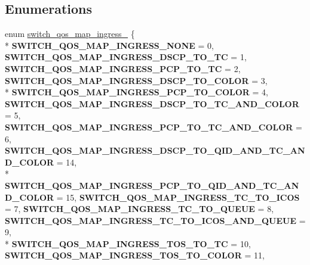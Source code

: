 \subsection*{Enumerations}
\begin{DoxyCompactItemize}
\item 
enum \hyperlink{group__QOS_ga31ec012ceb021095a2de97a1a3438612}{switch\+\_\+qos\+\_\+map\+\_\+ingress\+\_\+} \{ \\*
{\bfseries S\+W\+I\+T\+C\+H\+\_\+\+Q\+O\+S\+\_\+\+M\+A\+P\+\_\+\+I\+N\+G\+R\+E\+S\+S\+\_\+\+N\+O\+N\+E} = 0, 
{\bfseries S\+W\+I\+T\+C\+H\+\_\+\+Q\+O\+S\+\_\+\+M\+A\+P\+\_\+\+I\+N\+G\+R\+E\+S\+S\+\_\+\+D\+S\+C\+P\+\_\+\+T\+O\+\_\+\+T\+C} = 1, 
{\bfseries S\+W\+I\+T\+C\+H\+\_\+\+Q\+O\+S\+\_\+\+M\+A\+P\+\_\+\+I\+N\+G\+R\+E\+S\+S\+\_\+\+P\+C\+P\+\_\+\+T\+O\+\_\+\+T\+C} = 2, 
{\bfseries S\+W\+I\+T\+C\+H\+\_\+\+Q\+O\+S\+\_\+\+M\+A\+P\+\_\+\+I\+N\+G\+R\+E\+S\+S\+\_\+\+D\+S\+C\+P\+\_\+\+T\+O\+\_\+\+C\+O\+L\+O\+R} = 3, 
\\*
{\bfseries S\+W\+I\+T\+C\+H\+\_\+\+Q\+O\+S\+\_\+\+M\+A\+P\+\_\+\+I\+N\+G\+R\+E\+S\+S\+\_\+\+P\+C\+P\+\_\+\+T\+O\+\_\+\+C\+O\+L\+O\+R} = 4, 
{\bfseries S\+W\+I\+T\+C\+H\+\_\+\+Q\+O\+S\+\_\+\+M\+A\+P\+\_\+\+I\+N\+G\+R\+E\+S\+S\+\_\+\+D\+S\+C\+P\+\_\+\+T\+O\+\_\+\+T\+C\+\_\+\+A\+N\+D\+\_\+\+C\+O\+L\+O\+R} = 5, 
{\bfseries S\+W\+I\+T\+C\+H\+\_\+\+Q\+O\+S\+\_\+\+M\+A\+P\+\_\+\+I\+N\+G\+R\+E\+S\+S\+\_\+\+P\+C\+P\+\_\+\+T\+O\+\_\+\+T\+C\+\_\+\+A\+N\+D\+\_\+\+C\+O\+L\+O\+R} = 6, 
{\bfseries S\+W\+I\+T\+C\+H\+\_\+\+Q\+O\+S\+\_\+\+M\+A\+P\+\_\+\+I\+N\+G\+R\+E\+S\+S\+\_\+\+D\+S\+C\+P\+\_\+\+T\+O\+\_\+\+Q\+I\+D\+\_\+\+A\+N\+D\+\_\+\+T\+C\+\_\+\+A\+N\+D\+\_\+\+C\+O\+L\+O\+R} = 14, 
\\*
{\bfseries S\+W\+I\+T\+C\+H\+\_\+\+Q\+O\+S\+\_\+\+M\+A\+P\+\_\+\+I\+N\+G\+R\+E\+S\+S\+\_\+\+P\+C\+P\+\_\+\+T\+O\+\_\+\+Q\+I\+D\+\_\+\+A\+N\+D\+\_\+\+T\+C\+\_\+\+A\+N\+D\+\_\+\+C\+O\+L\+O\+R} = 15, 
{\bfseries S\+W\+I\+T\+C\+H\+\_\+\+Q\+O\+S\+\_\+\+M\+A\+P\+\_\+\+I\+N\+G\+R\+E\+S\+S\+\_\+\+T\+C\+\_\+\+T\+O\+\_\+\+I\+C\+O\+S} = 7, 
{\bfseries S\+W\+I\+T\+C\+H\+\_\+\+Q\+O\+S\+\_\+\+M\+A\+P\+\_\+\+I\+N\+G\+R\+E\+S\+S\+\_\+\+T\+C\+\_\+\+T\+O\+\_\+\+Q\+U\+E\+U\+E} = 8, 
{\bfseries S\+W\+I\+T\+C\+H\+\_\+\+Q\+O\+S\+\_\+\+M\+A\+P\+\_\+\+I\+N\+G\+R\+E\+S\+S\+\_\+\+T\+C\+\_\+\+T\+O\+\_\+\+I\+C\+O\+S\+\_\+\+A\+N\+D\+\_\+\+Q\+U\+E\+U\+E} = 9, 
\\*
{\bfseries S\+W\+I\+T\+C\+H\+\_\+\+Q\+O\+S\+\_\+\+M\+A\+P\+\_\+\+I\+N\+G\+R\+E\+S\+S\+\_\+\+T\+O\+S\+\_\+\+T\+O\+\_\+\+T\+C} = 10, 
{\bfseries S\+W\+I\+T\+C\+H\+\_\+\+Q\+O\+S\+\_\+\+M\+A\+P\+\_\+\+I\+N\+G\+R\+E\+S\+S\+\_\+\+T\+O\+S\+\_\+\+T\+O\+\_\+\+C\+O\+L\+O\+R} = 11, 

\end{DoxyCompactItemize}
